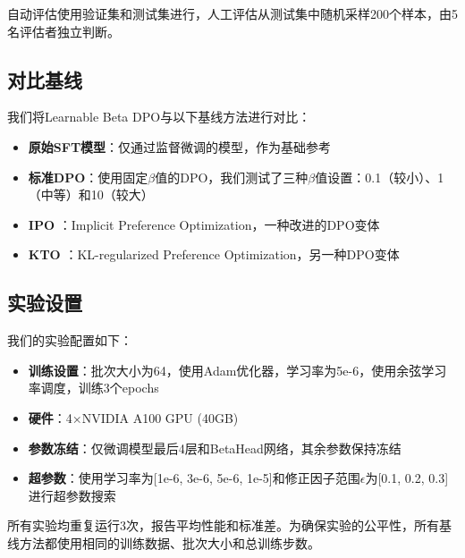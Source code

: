 自动评估使用验证集和测试集进行，人工评估从测试集中随机采样200个样本，由5名评估者独立判断。

\subsection{对比基线}
我们将Learnable Beta DPO与以下基线方法进行对比：

\begin{itemize}
    \item \textbf{原始SFT模型}：仅通过监督微调的模型，作为基础参考
    \item \textbf{标准DPO}：使用固定$\beta$值的DPO，我们测试了三种$\beta$值设置：0.1（较小）、1（中等）和10（较大）
    \item \textbf{IPO} \cite{azar2023general}：Implicit Preference Optimization，一种改进的DPO变体
    \item \textbf{KTO} \cite{kassner2023kto}：KL-regularized Preference Optimization，另一种DPO变体
\end{itemize}

\subsection{实验设置}
我们的实验配置如下：

\begin{itemize}
    \item \textbf{训练设置}：批次大小为64，使用Adam优化器，学习率为5e-6，使用余弦学习率调度，训练3个epochs
    \item \textbf{硬件}：4×NVIDIA A100 GPU (40GB)
    \item \textbf{参数冻结}：仅微调模型最后4层和BetaHead网络，其余参数保持冻结
    \item \textbf{超参数}：使用学习率为[1e-6, 3e-6, 5e-6, 1e-5]和修正因子范围$\epsilon$为[0.1, 0.2, 0.3]进行超参数搜索
\end{itemize}

所有实验均重复运行3次，报告平均性能和标准差。为确保实验的公平性，所有基线方法都使用相同的训练数据、批次大小和总训练步数。 